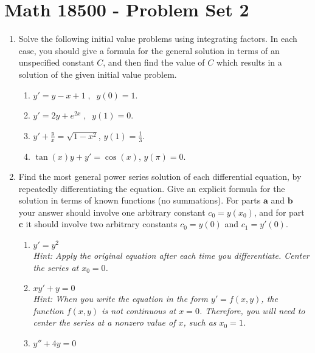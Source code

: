 \documentclass[10pt,psamsfonts,reqno,oneside,letterpaper]{amsart}
\begin{document}
	
	\author{Lucas Culler}
	
	\section*{Math 18500 - Problem Set 2}
	\begin{enumerate}
		\item Solve the following initial value problems using integrating factors.  In each case, you should give a formula for the general solution in terms of an unspecified constant $C$, and then find the value of $C$ which results in a solution of the given initial value problem. 
		\begin{enumerate}
			\item  $y' = y - x + 1 \;, \; \; y(0) = 1$.
			\item  $y' = 2y + e^{2x}\;,\;\; y(1) = 0$.
			\item  $y'+\frac{y}{x}=\sqrt{1-x^2}$, $y(1)=\frac{1}{3}$.
			\item  $\tan (x)y+y'=\cos(x)$, $y(\pi)=0$.
		\end{enumerate}
	
	\item Find the most general power series solution of each differential equation, by repeatedly differentiating the equation. Give an explicit formula for the solution in terms of known functions (no summations).  For parts $\textbf{a}$ and $\textbf{b}$ your answer should involve one arbitrary constant $c_0 = y(x_0)$, and for part $\textbf{c}$ it should involve two arbitrary constants $c_0 = y(0)$ and $c_1 = y'(0)$. 
	\begin{enumerate}
		\item  $y' = y^2$\\
		\textit{Hint: Apply the original equation after each time you differentiate. Center the series at $x_0 = 0$.}
		\item $xy' + y = 0$ \\
		\textit{Hint: When you write the equation in the form $y' = f(x,y)$, the function $f(x,y)$ is not continuous at $x=0$.  Therefore, you will need to center the series at a nonzero value of $x$, such as $x_0 =1$.}
		\item  $y'' + 4y = 0$ 
	\end{enumerate}


\end{enumerate}
\end{document}
